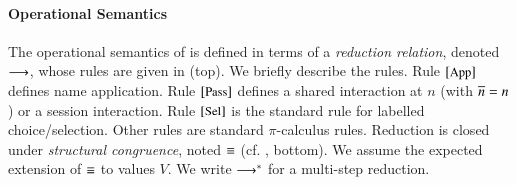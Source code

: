 \documentclass[preprint,11pt]{elsarticle}
\begin{document}


\paragraph{Operational Semantics}
The  operational semantics of \HOp is defined in terms of a \emph{reduction relation}, 
denoted $\longrightarrow$, whose rules are
given in 
  (top).
 We briefly describe the rules. 
Rule ${\scriptsize{[\textrm{\small App}]}}$ defines  name application.
Rule ${\scriptsize{[\textrm{\small Pass}]}}$ defines a shared interaction at $n$ 
(with $\overline{n}=n$) or a session interaction.
Rule ${\scriptsize{[\textrm{\small Sel}]}}$ is the standard rule for labelled choice/selection. %
Other rules are standard $\pi$-calculus rules.
Reduction is closed under \emph{structural congruence}, 
noted $\equiv$ (cf. , bottom). 
We assume the expected extension of $\equiv$ to values $V$.
We write $\longrightarrow^\ast$ for a multi-step reduction.


\end{document}
